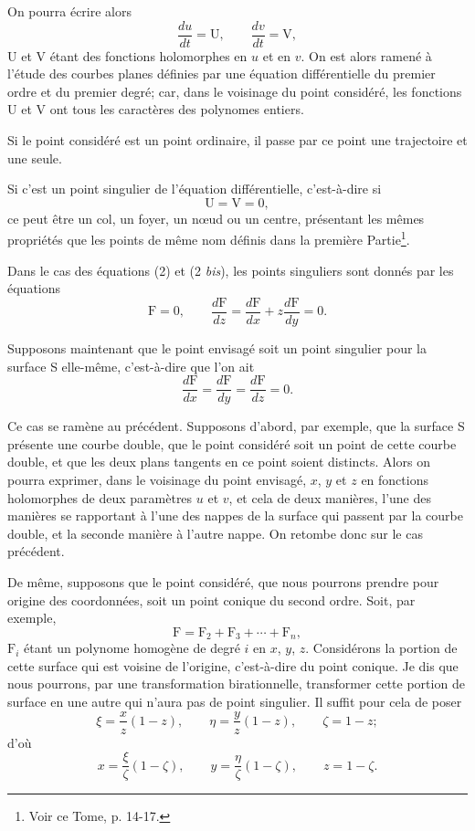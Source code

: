 \documentclass[11pt]{article}
\begin{document}
On pourra écrire alors
\[
\frac{du}{dt}=\mathrm{U},
\qquad
\frac{dv}{dt}=\mathrm{V},
\]
U et V étant des fonctions holomorphes en $u$ et en $v$. On est alors ramené à l’étude des courbes planes définies par une équation différentielle du premier ordre et du premier degré; car, dans le voisinage du point considéré, les fonctions U et V ont tous les caractères des polynomes entiers.

Si le point considéré est un point ordinaire, il passe par ce point une trajectoire et une seule.

Si c’est un point singulier de l’équation différentielle, c’est-à-dire si
\[
\mathrm{U}=\mathrm{V}=0,
\]
ce peut être un col, un foyer, un nœud ou un centre, présentant les mêmes propriétés que les points de même nom définis dans la première Partie\footnote{Voir ce Tome, p. 14-17.}.

Dans le cas des équations (2) et (2 \emph{bis}), les points singuliers sont donnés par les équations
\[
\mathrm{F}=0,
\qquad
\frac{d\mathrm{F}}{dz}=\frac{d\mathrm{F}}{dx}+z\frac{d\mathrm{F}}{dy}=0.
\]

Supposons maintenant que le point envisagé soit un point singulier pour la surface S elle-même, c’est-à-dire que l’on ait
\[
\frac{d\mathrm{F}}{dx}=\frac{d\mathrm{F}}{dy}=\frac{d\mathrm{F}}{dz}=0.
\]

Ce cas se ramène au précédent. Supposons d’abord, par exemple, que la surface S présente une courbe double, que le point considéré soit un point de cette courbe double, et que les deux plans tangents en ce point soient distincts. Alors on pourra exprimer, dans le voisinage du point envisagé, $x$, $y$ et $z$ en fonctions holomorphes de deux paramètres $u$ et $v$, et cela de deux manières, l’une des manières se rapportant à l’une des nappes de la surface qui passent par la courbe double, et la seconde manière à l’autre nappe. On retombe donc sur le cas précédent.

De même, supposons que le point considéré, que nous pourrons prendre pour origine des coordonnées, soit un point conique du second ordre. Soit, par exemple,
\[
\mathrm{F}=\mathrm{F}_2+\mathrm{F}_3+\cdots+\mathrm{F}_n,
\]
$\mathrm{F}_i$ étant un polynome homogène de degré $i$ en $x$, $y$, $z$. Considérons la portion de cette surface qui est voisine de l’origine, c’est-à-dire du point conique. Je dis que nous pourrons, par une transformation birationnelle, transformer cette portion de surface en une autre qui n’aura pas de point singulier. Il suffit pour cela de poser
\[
\xi=\frac{x}{z}(1-z),
\qquad
\eta=\frac{y}{z}(1-z),
\qquad
\zeta=1-z;
\]
d’où
\[
x=\frac{\xi}{\zeta}(1-\zeta),
\qquad
y=\frac{\eta}{\zeta}(1-\zeta),
\qquad
z=1-\zeta.
\]
\end{document}
